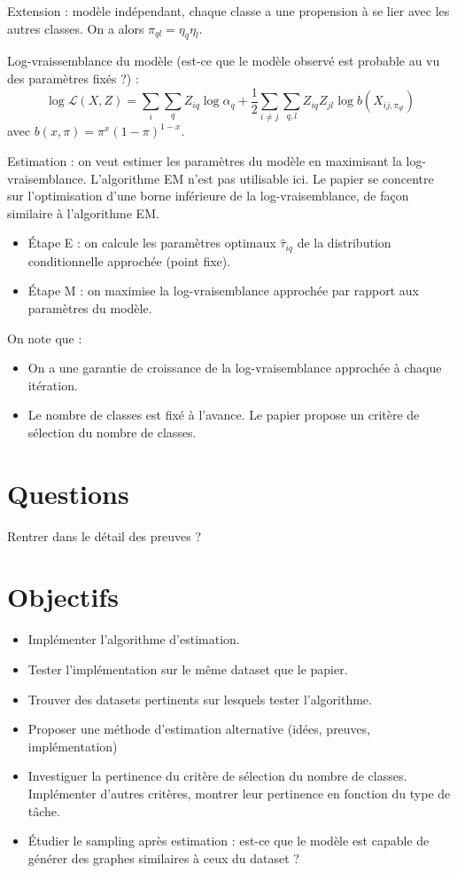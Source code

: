 \vspace{5mm}

Extension : modèle indépendant, chaque classe a une propension à se lier avec les autres classes. On a alors $\pi_{ql}=\eta_q\eta_l$.

Log-vraissemblance du modèle (est-ce que le modèle observé est probable au vu des paramètres fixés ?) :
$$\log \mathcal{L}(X, Z) = \sum_i\sum_qZ_{iq}\log \alpha_q + \frac{1}{2} \sum_{i\neq j}\sum_{q,l}Z_{iq}Z_{jl}\log b(X_{ij,\pi_{ql}})$$
avec $b(x,\pi)=\pi^x(1-\pi)^{1-x}$.

Estimation : on veut estimer les paramètres du modèle en maximisant la log-vraisemblance. L'algorithme EM n'est pas utilisable ici. Le papier se concentre sur l'optimisation d'une borne inférieure de la log-vraisemblance, de façon similaire à l'algorithme EM.

\begin{itemize}
    \item Étape E : on calcule les paramètres optimaux $\hat{\tau}_{iq}$ de la distribution conditionnelle approchée (point fixe).
    \item Étape M : on maximise la log-vraisemblance approchée par rapport aux paramètres du modèle.
\end{itemize}
On note que :
\begin{itemize}
    \item On a une garantie de croissance de la log-vraisemblance approchée à chaque itération.
    \item Le nombre de classes est fixé à l'avance. Le papier propose un critère de sélection du nombre de classes.
\end{itemize}


\section{Questions}

Rentrer dans le détail des preuves ?

\section{Objectifs}

\begin{itemize}
    \item Implémenter l'algorithme d'estimation.
    \item Tester l'implémentation sur le même dataset que le papier.
    \item Trouver des datasets pertinents sur lesquels tester l'algorithme.
    \item Proposer une méthode d'estimation alternative (idées, preuves, implémentation)
    \item Investiguer la pertinence du critère de sélection du nombre de classes. Implémenter d'autres critères, montrer leur pertinence en fonction du type de tâche.
    \item Étudier le sampling après estimation : est-ce que le modèle est capable de générer des graphes similaires à ceux du dataset ?
\end{itemize}


